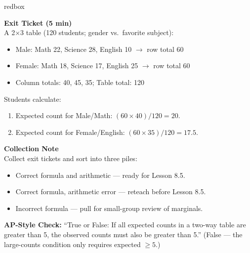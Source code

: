 \documentclass[10pt]{article}
\begin{document}
\begin{skillbox}{redbox}
\begin{minipage}[t]{0.48\linewidth}
    \textbf{Exit Ticket (5 min)}\\
    A 2$\times$3 table (120 students; gender vs.\ favorite subject):
    \begin{itemize}
        \item Male: Math 22, Science 28, English 10 $\to$ row total 60
        \item Female: Math 18, Science 17, English 25 $\to$ row total 60
        \item Column totals: 40, 45, 35; Table total: 120
    \end{itemize}
    Students calculate:
    \begin{enumerate}
        \item Expected count for Male/Math: $(60 \times 40)/120 = 20$.
        \item Expected count for Female/English: $(60 \times 35)/120 = 17.5$.
    \end{enumerate}
\end{minipage}
\hfill
\begin{minipage}[t]{0.48\linewidth}
    \textbf{Collection Note}\\
    Collect exit tickets and sort into three piles:
    \begin{itemize}
        \item Correct formula and arithmetic --- ready for Lesson 8.5.
        \item Correct formula, arithmetic error --- reteach before Lesson 8.5.
        \item Incorrect formula --- pull for small-group review of marginals.
    \end{itemize}
    \textbf{AP-Style Check:} ``True or False: If all expected counts in a two-way
    table are greater than 5, the observed counts must also be greater than 5.''
    (False --- the large-counts condition only requires expected $\ge 5$.)
\end{minipage}
\end{skillbox}
\end{document}
